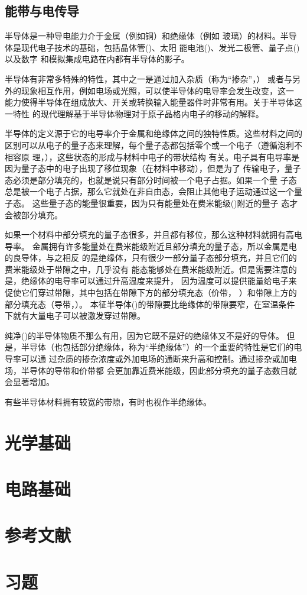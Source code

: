 \subsection{能带与电传导}
\par 半导体是一种导电能力介于金属（例如铜）和绝缘体（例如
玻璃）的材料。半导体是现代电子技术的基础，包括晶体管()、太阳
能电池()、发光二极管、量子点()以及数字
和模拟集成电路在内都有半导体的影子。
\par 半导体有非常多特殊的特性，其中之一是通过加入杂质（称为“掺杂”，）
或者与另外的现象相互作用，例如电场或光照，可以使半导体的电导率会发生改变，这一
能力使得半导体在组成放大、开关或转换输入能量器件时非常有用。关于半导体这一特性
的现代理解基于半导体物理对于原子晶格内电子的移动的解释。
\par 半导体的定义源于它的电导率介于金属和绝缘体之间的独特性质。这些材料之间的
区别可以从电子的量子态来理解，每个量子态都包括零个或一个电子（遵循泡利不相容原
理，），这些状态的形成与材料中电子的带状结构
有关。电子具有电导率是因为量子态中的电子出现了移位现象（在材料中移动），但是为了
传输电子，量子态必须是部分填充的，也就是说只有部分时间被一个电子占据。如果一个量
子态总是被一个电子占据，那么它就处在非自由态，会阻止其他电子运动通过这一个量子态。
这些量子态的能量很重要，因为只有能量处在费米能级()附近的量子
态才会被部分填充。
\par 如果一个材料中部分填充的量子态很多，并且都有移位，那么这种材料就拥有高电导率。
金属拥有许多能量处在费米能级附近且部分填充的量子态，所以金属是电的良导体，与之相反
的是绝缘体，只有很少一部分量子态部分填充，并且它们的费米能级处于带隙之中，几乎没有
能态能够处在费米能级附近。但是需要注意的是，绝缘体的电导率可以通过升高温度来提升，
因为温度可以提供能量给电子来促使它们穿过带隙，其中包括在带隙下方的部分填充态（价带，
）和带隙上方的部分填充态（导带，）。
本征半导体()的带隙要比绝缘体的带隙要窄，在室温条件
下就有大量电子可以被激发穿过带隙。
\par 纯净()的半导体物质不那么有用，因为它既不是好的绝缘体又不是好的导体。
但是，半导体（也包括部分绝缘体，称为“半绝缘体”）的一个重要的特性是它们的电导率可以通
过杂质的掺杂浓度或外加电场的通断来升高和控制。通过掺杂或加电场，半导体的导带和价带都
会更加靠近费米能级，因此部分填充的量子态数目就会显著增加。
\par 有些半导体材料拥有较宽的带隙，有时也视作半绝缘体。

\section{光学基础}
\section{电路基础}
\section*{参考文献}
\section*{习题}